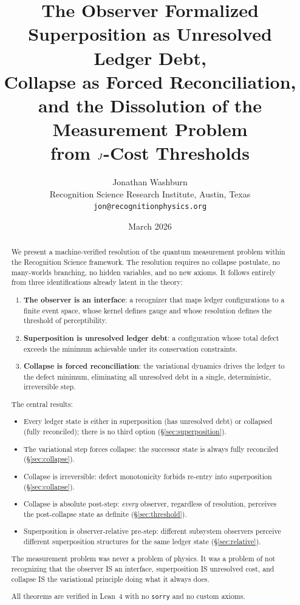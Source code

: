 \documentclass[11pt,a4paper]{article}
\title{\textbf{The Observer Formalized}\\[0.3em]
\large Superposition as Unresolved Ledger Debt,\\
Collapse as Forced Reconciliation,\\
and the Dissolution of the Measurement Problem\\
from $J$-Cost Thresholds}
\author{Jonathan Washburn\\
\small Recognition Science Research Institute, Austin, Texas\\
\small \texttt{jon@recognitionphysics.org}}
\date{March 2026}
\theoremstyle{plain}
\theoremstyle{definition}
\theoremstyle{remark}
\begin{document}
\maketitle

\begin{abstract}
We present a machine-verified resolution of the quantum measurement problem within the Recognition Science framework.
The resolution requires no collapse postulate, no many-worlds branching, no hidden variables, and no new axioms.
It follows entirely from three identifications already latent in the theory:

\begin{enumerate}[nosep]
\item \textbf{The observer is an interface}: a recognizer that maps ledger configurations to a finite event space, whose kernel defines gauge and whose resolution defines the threshold of perceptibility.
\item \textbf{Superposition is unresolved ledger debt}: a configuration whose total defect exceeds the minimum achievable under its conservation constraints.
\item \textbf{Collapse is forced reconciliation}: the variational dynamics drives the ledger to the defect minimum, eliminating all unresolved debt in a single, deterministic, irreversible step.
\end{enumerate}

The central results:
\begin{itemize}[nosep]
\item Every ledger state is either in superposition (has unresolved debt) or collapsed (fully reconciled); there is no third option (\S\ref{sec:superposition}).
\item The variational step forces collapse: the successor state is always fully reconciled (\S\ref{sec:collapse}).
\item Collapse is irreversible: defect monotonicity forbids re-entry into superposition (\S\ref{sec:collapse}).
\item Collapse is absolute post-step: \emph{every} observer, regardless of resolution, perceives the post-collapse state as definite (\S\ref{sec:threshold}).
\item Superposition is observer-relative pre-step: different subsystem observers perceive different superposition structures for the same ledger state (\S\ref{sec:relative}).
\end{itemize}

The measurement problem was never a problem of physics.
It was a problem of not recognizing that the observer IS an interface, superposition IS unresolved cost, and collapse IS the variational principle doing what it always does.

All theorems are verified in Lean~4 with no \texttt{sorry} and no custom axioms.
\end{abstract}
\end{document}

